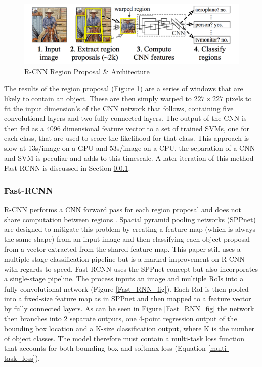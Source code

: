 \documentclass[a4paper,11pt,notitlepage]{article}
\begin{document}
\noindent \begin{figure}[h!]
\includegraphics[width = 1.0\hsize]{./figures/region_prop.png}
\caption{R-CNN Region Proposal \& Architecture \cite{DBLP:journals/corr/GirshickDDM13}}
\label{Selective_search}
\end{figure}

The results of the region proposal (Figure \ref{Selective_search}) are a series of windows that are likely to contain an object. These are then simply warped to $227 \times 227$ pixels to fit the input dimension's of the CNN network that follows, containing five convolutional layers and two fully connected layers. The output of the CNN is then fed as a 4096 dimensional feature vector to a set of trained SVMs, one for each class, that are used to score the likelihood for that class. This approach is slow at 13s/image on a GPU and 53s/image on a CPU, the separation of a CNN and SVM is peculiar and adds to this timescale. A later iteration of this method Fast-RCNN is discussed in Section \ref{Fast_RCNN}.

\subsubsection{Fast-RCNN} \label{Fast_RCNN}

R-CNN performs a CNN forward pass for each region proposal and does not share computation between regions \cite{DBLP:journals/corr/Girshick15}. Spacial pyramid pooling networks (SPPnet) \cite{DBLP:journals/corr/HeZR014} are designed to mitigate this problem by creating a feature map (which is always the same shape) from an input image and then classifying each object proposal from a vector extracted from the shared feature map. This paper still uses a multiple-stage classification pipeline but is a marked improvement on R-CNN with regards to speed. 
\newline \newline
Fast-RCNN uses the SPPnet concept but also incorporates a single-stage pipeline. The process inputs an image and multiple RoIs into a fully convolutional network (Figure \ref{Fast_RNN_fig}). Each RoI is then pooled into a fixed-size feature map as in SPPnet and then mapped to a feature vector by fully connected layers. As can be seen in Figure \ref{Fast_RNN_fig} the network then branches into 2 separate outputs, one 4-point regression output of the bounding box location and a K-size classification output, where K is the number of object classes. The model therefore must contain a multi-task loss function that accounts for both bounding box and softmax loss (Equation \ref{multi-task_loss}).
\end{document}
